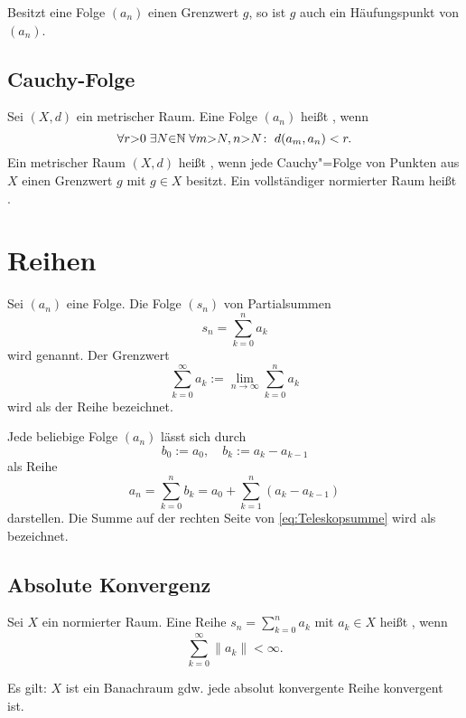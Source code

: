 \noindent
Besitzt eine Folge $(a_n)$ einen Grenzwert $g$, so ist $g$ auch ein
Häufungspunkt von $(a_n)$.

\subsection{Cauchy-Folge}
\begin{definition}\mbox{}\newline
Sei $(X,d)$ ein metrischer Raum.
Eine Folge $(a_n)$ heißt , wenn
\begin{equation}
\forall r{>}0\;\exists N{\in}\mathbb N\;\forall m{>}N,n{>}N\colon\;
d(a_m,a_n)<r.
\end{equation}
\noindent
Ein metrischer Raum $(X,d)$ heißt ,
wenn jede Cauchy"=Folge von Punkten aus $X$ einen Grenzwert $g$
mit $g\in X$ besitzt. Ein vollständiger normierter Raum heißt
.
\end{definition}

\section{Reihen}
\begin{definition}[Reihe]\mbox{}\newline
Sei $(a_n)$ eine Folge. Die Folge $(s_n)$ von
Partialsummen%
\begin{equation}
s_n = \sum_{k=0}^n a_k
\end{equation}
wird  genannt. Der Grenzwert
\begin{equation}
\sum_{k=0}^\infty a_k := \lim_{n\to\infty}\sum_{k=0}^n a_k
\end{equation}
wird als  der Reihe bezeichnet.
\end{definition}
Jede beliebige Folge $(a_n)$ lässt sich durch
\begin{equation}
b_0:=a_0,\quad b_k:=a_k-a_{k-1}
\end{equation}
als Reihe
\begin{equation}\label{eq:Teleskopsumme}
a_n = \sum_{k=0}^n b_k = a_0+\sum_{k=1}^n (a_k-a_{k-1})
\end{equation}
darstellen. Die Summe auf der rechten Seite von \eqref{eq:Teleskopsumme}
wird als  bezeichnet.

\subsection{Absolute Konvergenz}
\begin{definition}\mbox{}\newline
Sei $X$ ein normierter Raum.
Eine Reihe $s_n=\sum_{k=0}^n a_k$ mit $a_k\in X$
heißt , wenn
\begin{equation}\label{eq:absolut-convergence}\textstyle
\sum_{k=0}^\infty \|a_k\| < \infty.
\end{equation}
\end{definition}
\noindent
Es gilt: $X$ ist ein Banachraum gdw. jede absolut konvergente
Reihe konvergent ist.

